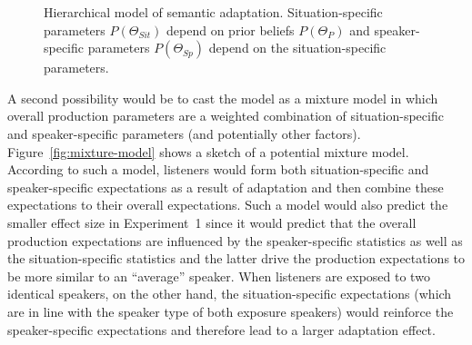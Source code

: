 \documentclass[10pt,letterpaper]{article}
\begin{document}
\begin{figure}
\center
{}
\caption{Hierarchical model of semantic adaptation. Situation-specific parameters $P(\Theta_{Sit})$ depend on prior beliefs $P(\Theta_P)$ and speaker-specific parameters $P(\Theta_{Sp})$ depend on the situation-specific parameters. \label{fig:model}}
\end{figure}



A second possibility would be to cast the model as a mixture model in which overall production parameters are a 
weighted combination of situation-specific and speaker-specific parameters (and potentially other factors). 
Figure~\ref{fig:mixture-model} shows a sketch of a potential mixture model.
According to such a model, listeners would form both situation-specific and speaker-specific
expectations as a result of adaptation and then combine these expectations to their overall expectations. 
Such a model would also predict the smaller effect size in Experiment~1 since it would predict
that the overall production expectations are influenced by the speaker-specific statistics as 
well as the situation-specific statistics and the latter drive the production expectations to be more similar to
an ``average'' speaker. When listeners are exposed to two identical speakers, on the other hand, the 
situation-specific expectations (which are in line with the speaker type of both exposure speakers) 
would reinforce the speaker-specific expectations and therefore lead to a larger adaptation effect.
\end{document}
